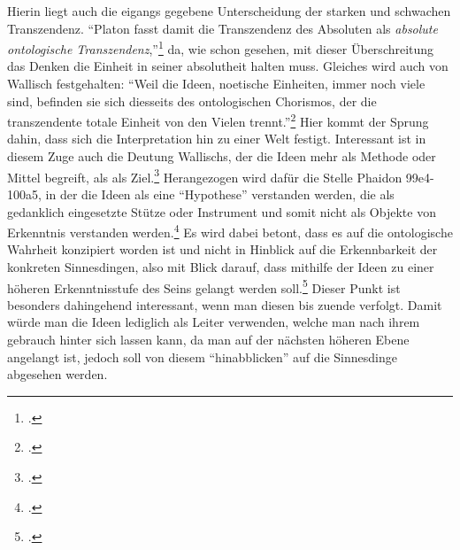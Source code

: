 Hierin liegt auch die eigangs gegebene Unterscheidung der starken und schwachen Transzendenz.
\enquote{Platon fasst damit die Transzendenz des Absoluten als \emph{absolute ontologische Transzendenz},}\footcite[][S. 224]{halfwassenaufstieg2006} da, wie schon gesehen, mit dieser Überschreitung das Denken die Einheit in seiner absolutheit halten muss. Gleiches wird auch von Wallisch festgehalten: \enquote{Weil die Ideen, noetische Einheiten, immer noch viele sind, befinden sie sich diesseits des ontologischen Chorismos, der die transzendente totale Einheit von den Vielen trennt.}\footcite[][S. 17]{Wallisch}
Hier kommt der Sprung dahin, dass sich die Interpretation hin zu einer Welt festigt. 
Interessant ist in diesem Zuge auch die Deutung Wallischs, der
die Ideen mehr als Methode oder Mittel begreift, als als Ziel.\footcite[vgl.][S. 26]{Wallisch} Herangezogen wird dafür die Stelle Phaidon 99e4-100a5, in der die Ideen als eine \enquote{Hypothese} verstanden werden, die als gedanklich eingesetzte Stütze oder Instrument und somit nicht als Objekte von Erkenntnis verstanden werden.\footcite[vgl.][S. 26]{Wallisch} Es wird dabei betont, dass es auf die ontologische Wahrheit konzipiert worden ist und nicht in Hinblick auf die Erkennbarkeit der konkreten Sinnesdingen, also mit Blick darauf, dass mithilfe der Ideen zu einer höheren Erkenntnisstufe des Seins gelangt werden soll.\footcite[vgl.][S. 27]{Wallisch}
Dieser Punkt ist besonders dahingehend interessant, wenn man diesen bis zuende verfolgt. Damit würde man die Ideen lediglich als Leiter verwenden, welche man nach ihrem gebrauch hinter sich lassen kann, da man auf der nächsten höheren Ebene angelangt ist, jedoch soll von diesem \enquote{hinabblicken} auf die Sinnesdinge abgesehen werden. 
